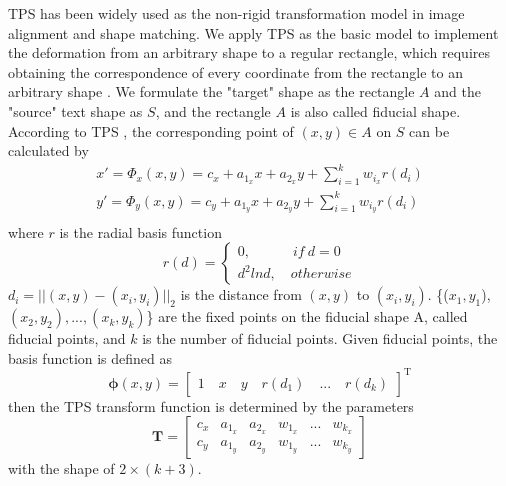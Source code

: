 \documentclass[sigconf]{acmart}
\begin{document}
	TPS \cite{bookstein1989principal} has been widely used as the non-rigid transformation model in image alignment and shape matching. We apply TPS as the basic model to implement the deformation from an arbitrary shape  to a regular rectangle, which requires obtaining the correspondence of every coordinate from the rectangle to an arbitrary shape . We formulate the "target" shape as the rectangle $A$ and the "source" text shape as $S$, and the rectangle $A$ is also called fiducial shape. According to TPS   \cite{bookstein1989principal}, the corresponding point of $(x,y) \in A$ on $S$ can be calculated by
	\begin{equation}
	\begin{array}{l}
	x' = \Phi_x(x,y) = c_x + a_{1_x} x + a_{2_x} y + \sum_{i=1}^{k}w_{i_x} r(d_i) \\
	y' = \Phi_y(x,y) = c_y + a_{1_y} x + a_{2_y} y + \sum_{i=1}^{k}w_{i_y} r(d_i) \\
	\end{array}
	\label{equ:1}
	\end{equation}
where $r$ is the radial basis function
	\begin{equation}
	r(d) = \left\{
	\begin{array}{l}
	0, \quad \quad \quad if \ d = 0\\
	d^2ln d, \quad otherwise
	\end{array}
	\right.
	\end{equation}
	$d_i=||(x,y)-(x_i,y_i)||_2$ is the distance from $(x,y)$ to $(x_i,y_i)$. \{($x_1,y_1$), $(x_2,y_2), ... , (x_k,y_k)$\} are the fixed points on the fiducial shape A, called fiducial points, and $k$ is the number of fiducial points. Given fiducial points, the basis function is defined as 
	\begin{equation}
	\mathbf{\phi}(x,y) = \left [\begin{array}{c}
	1 \quad x \quad y \quad r(d_1) \quad ... \quad r(d_k)
	\end{array} \right] ^ \mathrm{ T }
	\end{equation}
	then the TPS transform function is determined by the parameters \begin{equation}
	\mathbf{T} = \left [
	\begin{array}{cccccc}
	c_x & a_{1_x} & a_{2_x}  & w_{1_x} & ... &  w_{k_x}\\
	c_y & a_{1_y} & a_{2_y} &  w_{1_y} & ... &  w_{k_y}
	\end{array}
	\right ]
	\end{equation} with the shape of $2\times(k+3)$. 
	
\end{document}
